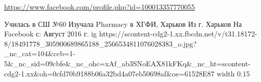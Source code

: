 
 
 
 
 

\url{https://www.facebook.com/profile.php?id=100013357770055}\par
Училась в СШ №60
Изучала Pharmacy в ХГФИ, Харьков
Из г. Харьков
На Facebook с: Август 2016 г.
\ifcmt
  ig https://scontent-cdg2-1.xx.fbcdn.net/v/t31.18172-8/18491778_305900689865188_2566534811076028383_o.jpg?_nc_cat=104&ccb=1-5&_nc_sid=09cbfe&_nc_ohc=xAf_ab3SNoEAX81kFKq&_nc_ht=scontent-cdg2-1.xx&oh=0cfd70b9188b06a32bd4a07eb50698af&oe=61528E87
  width 0.15
\fi

